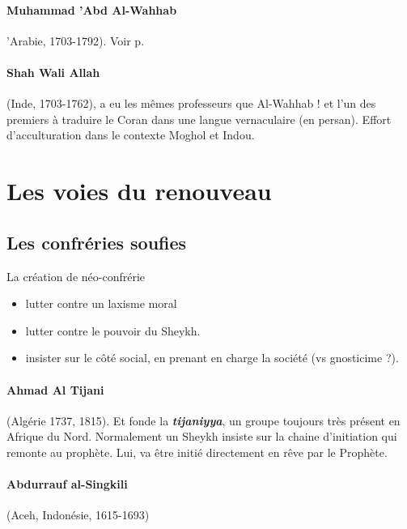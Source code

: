 \paragraph{Muhammad 'Abd Al-Wahhab } 'Arabie, 1703-1792). Voir p. \pageref{Theol:AlWahhab}

\paragraph{Shah Wali Allah} (Inde, 1703-1762), \label{Theo:waliAllah} a eu les mêmes professeurs que Al-Wahhab ! et l'un des premiers à traduire le Coran dans une langue vernaculaire (en persan). Effort d'acculturation dans le contexte Moghol et Indou. 




 
\section{Les voies du renouveau} 
\subsection{Les confréries soufies}

La création de néo-confrérie
\begin{itemize}
    \item lutter contre un laxisme moral
    \item lutter contre le pouvoir du Sheykh.
    \item insister sur le côté social, en prenant en charge la société (vs gnosticime ?).
\end{itemize}




\paragraph{Ahmad Al Tijani} (Algérie 1737, 1815). Et fonde la \emph{\textbf{tijaniyya}}, un groupe toujours très présent en Afrique du Nord. Normalement un Sheykh insiste sur la chaine d'initiation qui remonte au prophète. Lui, va être initié directement en rêve par le Prophète.

\paragraph{Abdurrauf al-Singkili} (Aceh, Indonésie, 1615-1693)

